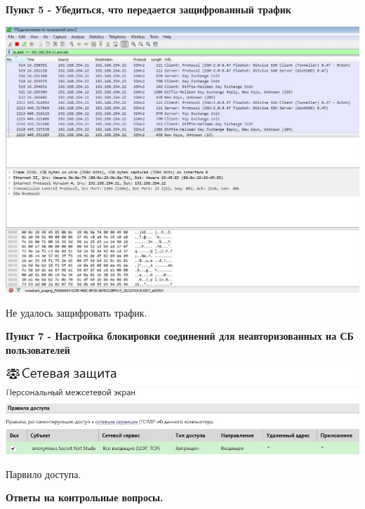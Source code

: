 \documentclass[a4paper,14pt]{extarticle}
\begin{document}
    \textbf{Пункт 5 - Убедиться, что передается защифрованный трафик}
    \begin{center}
        \includegraphics[scale=0.3]{pics/5.jpg}

        Не удалось защифровать трафик.
    \end{center}

    \textbf{Пункт 7 - Настройка блокировки соединений для неавторизованных на СБ пользователей}
    \begin{center}
        \includegraphics[scale=0.5]{pics/7.jpg}

       Парвило доступа.
    \end{center}

    \textbf{Ответы на контрольные вопросы.}
\end{document}
